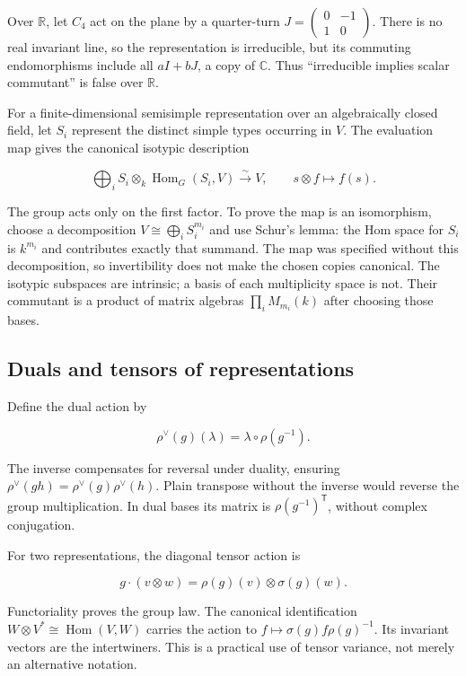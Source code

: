 \documentclass[
  11pt,
]{article}
\begin{document}
Over \(\mathbb R\), let \(C_4\) act on the plane by a quarter-turn
\(J=\begin{pmatrix}0&-1\\1&0\end{pmatrix}\). There is no real invariant
line, so the representation is irreducible, but its commuting
endomorphisms include all \(aI+bJ\), a copy of \(\mathbb C\). Thus
``irreducible implies scalar commutant'' is false over \(\mathbb R\).

For a finite-dimensional semisimple representation over an algebraically
closed field, let \(S_i\) represent the distinct simple types occurring
in \(V\). The evaluation map gives the canonical isotypic description

\[\bigoplus_i S_i\otimes_k\operatorname{Hom}_G(S_i,V)
\xrightarrow{\ \sim\ }V,\qquad s\otimes f\longmapsto f(s).\]

The group acts only on the first factor. To prove the map is an
isomorphism, choose a decomposition \(V\cong\bigoplus_i S_i^{m_i}\) and
use Schur's lemma: the Hom space for \(S_i\) is \(k^{m_i}\) and
contributes exactly that summand. The map was specified without this
decomposition, so invertibility does not make the chosen copies
canonical. The isotypic subspaces are intrinsic; a basis of each
multiplicity space is not. Their commutant is a product of matrix
algebras \(\prod_i M_{m_i}(k)\) after choosing those bases.

\subsection{Duals and tensors of
representations}\label{duals-and-tensors-of-representations}

Define the dual action by

\[\rho^\vee(g)(\lambda)=\lambda\circ\rho(g^{-1}).\]

The inverse compensates for reversal under duality, ensuring
\(\rho^\vee(gh)=\rho^\vee(g)\rho^\vee(h)\). Plain transpose without the
inverse would reverse the group multiplication. In dual bases its matrix
is \(\rho(g^{-1})^{\mathsf T}\), without complex conjugation.

For two representations, the diagonal tensor action is

\[g\cdot(v\otimes w)=\rho(g)(v)\otimes\sigma(g)(w).\]

Functoriality proves the group law. The canonical identification
\(W\otimes V^*\cong\operatorname{Hom}(V,W)\) carries the action to
\(f\mapsto\sigma(g)f\rho(g)^{-1}\). Its invariant vectors are the
intertwiners. This is a practical use of tensor variance, not merely an
alternative notation.
\end{document}

